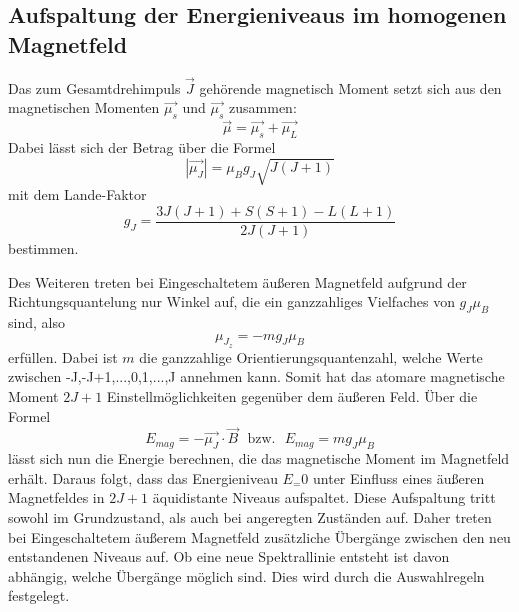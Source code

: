 \subsection{Aufspaltung der Energieniveaus im homogenen Magnetfeld}
Das zum Gesamtdrehimpuls $\vec{J}$ gehörende magnetisch Moment setzt sich aus den
magnetischen Momenten $\vec{\mu_s}$ und $\vec{\mu_s}$ zusammen:
\begin{equation}
  \vec{\mu}=\vec{\mu_s}+ \vec{\mu_L}
  \label{eqn:magges}
\end{equation}
Dabei lässt sich der Betrag über die Formel
\begin{equation}
  |\vec{\mu_J}|=\mu_B g_J\sqrt{J(J+1)}
  \label{eqn:muJ}
\end{equation}
mit dem Lande-Faktor
\begin{equation}
  g_J=\frac{3J(J+1)+S(S+1)-L(L+1)}{2J(J+1)}
  \label{eqn:gJ}
\end{equation}
bestimmen.

Des Weiteren treten bei Eingeschaltetem äußeren Magnetfeld aufgrund der
Richtungsquantelung nur Winkel auf, die ein ganzzahliges Vielfaches von
$g_J \mu_B$ sind, also
\begin{equation}
  \mu_{J_z}=-mg_J \mu_B
  \label{eqn:richtung}
\end{equation}
erfüllen. Dabei ist $m$ die ganzzahlige Orientierungsquantenzahl, welche
Werte zwischen -J,-J+1,...,0,1,...,J annehmen kann. Somit hat das
atomare magnetische Moment $2J+1$ Einstellmöglichkeiten gegenüber dem
äußeren Feld. Über die Formel
\begin{equation}
  E_{mag}=-\vec{\mu_J}\cdot\vec{B}\:\:\:\text{bzw.}\:\:\:E_{mag}=mg_J \mu_B
  \label{eqn:emag}
\end{equation}
lässt sich nun die Energie berechnen, die das magnetische Moment
im Magnetfeld erhält. Daraus folgt, dass das Energieniveau $E_=0$
unter Einfluss eines äußeren Magnetfeldes in $2J+1$ äquidistante
Niveaus aufspaltet.
Diese Aufspaltung tritt sowohl im Grundzustand, als auch bei
angeregten Zuständen auf. Daher treten bei Eingeschaltetem
äußerem Magnetfeld zusätzliche Übergänge zwischen den neu entstandenen
Niveaus auf. Ob eine neue Spektrallinie entsteht ist davon abhängig, welche
Übergänge möglich sind. Dies wird durch die
Auswahlregeln festgelegt.

